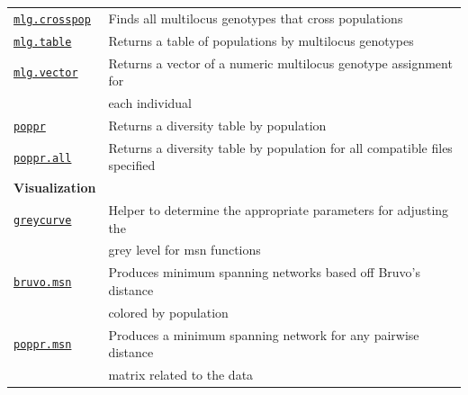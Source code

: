 \documentclass[letterpaper]{article}\usepackage[]{graphicx}\usepackage[]{color}
\begin{document}
\begin{table}[ht]
\begin{tabular}{ll}
\texttt{\hyperref[mlg:cross:mlg.crosspop]{mlg.crosspop}} & Finds all multilocus genotypes that cross populations \\
\texttt{\hyperref[mlg:table:mlg.table]{mlg.table}} & Returns a table of populations by multilocus genotypes \\
\texttt{\hyperref[mlg:mix:mlg.vector]{mlg.vector}} & Returns a vector of a numeric multilocus genotype assignment for \\ 
 & each individual \\
\texttt{\hyperref[summary:poppr]{poppr}} & Returns a diversity table by population \\
\texttt{\hyperref[summary:poppr]{poppr.all}} & Returns a diversity table by population for all compatible files specified \\
\hline
\textbf{Visualization} & \\
\texttt{\hyperref[index:trees:greycurve]{greycurve}} & Helper to determine the appropriate parameters for adjusting the\\
 & grey level for msn functions \\
\texttt{\hyperref[index:trees:bruvo.msn]{bruvo.msn}} & Produces minimum spanning networks based off Bruvo's distance\\
 & colored by population \\
\texttt{\hyperref[index:trees:poppr.msn]{poppr.msn}} & Produces a minimum spanning network for any pairwise distance\\  
 & matrix related to the data \\
\hline
\end{tabular}
\end{table}

\newpage



\end{document}
